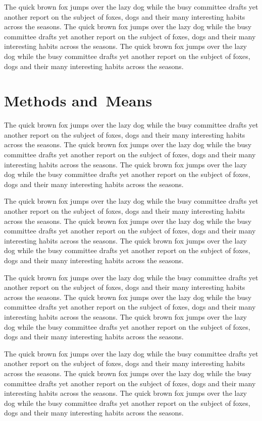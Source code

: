 \documentclass{article}
\begin{document}
The quick brown fox jumps over the lazy dog while the busy committee drafts yet another report on the subject of foxes, dogs and their many interesting habits across the seasons. The quick brown fox jumps over the lazy dog while the busy committee drafts yet another report on the subject of foxes, dogs and their many interesting habits across the seasons. The quick brown fox jumps over the lazy dog while the busy committee drafts yet another report on the subject of foxes, dogs and their many interesting habits across the seasons. 

\section[Short Methods]{Methods and~Means}\label{sec3}
The quick brown fox jumps over the lazy dog while the busy committee drafts yet another report on the subject of foxes, dogs and their many interesting habits across the seasons. The quick brown fox jumps over the lazy dog while the busy committee drafts yet another report on the subject of foxes, dogs and their many interesting habits across the seasons. The quick brown fox jumps over the lazy dog while the busy committee drafts yet another report on the subject of foxes, dogs and their many interesting habits across the seasons. 

The quick brown fox jumps over the lazy dog while the busy committee drafts yet another report on the subject of foxes, dogs and their many interesting habits across the seasons. The quick brown fox jumps over the lazy dog while the busy committee drafts yet another report on the subject of foxes, dogs and their many interesting habits across the seasons. The quick brown fox jumps over the lazy dog while the busy committee drafts yet another report on the subject of foxes, dogs and their many interesting habits across the seasons. 

The quick brown fox jumps over the lazy dog while the busy committee drafts yet another report on the subject of foxes, dogs and their many interesting habits across the seasons. The quick brown fox jumps over the lazy dog while the busy committee drafts yet another report on the subject of foxes, dogs and their many interesting habits across the seasons. The quick brown fox jumps over the lazy dog while the busy committee drafts yet another report on the subject of foxes, dogs and their many interesting habits across the seasons. 

The quick brown fox jumps over the lazy dog while the busy committee drafts yet another report on the subject of foxes, dogs and their many interesting habits across the seasons. The quick brown fox jumps over the lazy dog while the busy committee drafts yet another report on the subject of foxes, dogs and their many interesting habits across the seasons. The quick brown fox jumps over the lazy dog while the busy committee drafts yet another report on the subject of foxes, dogs and their many interesting habits across the seasons. 
\end{document}
